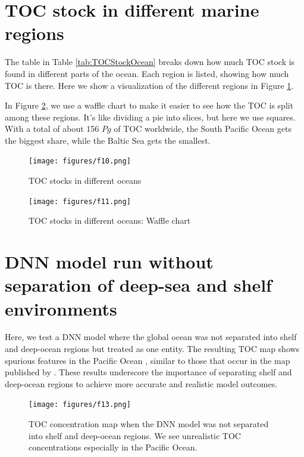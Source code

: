 \documentclass[journal abbreviation, manuscript]{copernicus}
\begin{document}
\newpage
\section{TOC stock in different marine regions}
\label{appendix:tocStockDiffMarine}
The table in Table \ref{tab:TOCStockOcean} breaks down how much TOC stock is found in different parts of the ocean. Each region is listed, showing how much TOC is there. Here we show a visualization of the different regions in Figure \ref{fig:TOCStockOceans}.

In Figure \ref{fig:TOCStockOceansWaffle}, we use a waffle chart to make it easier to see how the TOC is split among these regions. It's like dividing a pie into slices, but here we use squares. With a total of about 156 $Pg$ of TOC worldwide, the South Pacific Ocean gets the biggest share, while the Baltic Sea gets the smallest.
\begin{figure}[!htb]   
\centering
   \texttt{[image: figures/f10.png]}
   \caption{TOC stocks in different oceans}
   \label{fig:TOCStockOceans}
\end{figure}

\begin{figure}[!htb]
   \centering
   \texttt{[image: figures/f11.png]}
   \caption{TOC stocks in different oceans: Waffle chart}
   \label{fig:TOCStockOceansWaffle}
\end{figure}

\newpage
\section{DNN model run without separation of deep-sea and shelf environments}
\label{appendix:entireModel}
Here, we test a DNN model where the global ocean was not separated into shelf and deep-ocean regions but treated as one entity. The resulting TOC map shows spurious features in the Pacific Ocean , similar to those that occur in the map published by \cite{LeeTOCkNN}. These results underscore the importance of separating shelf and deep-ocean regions to achieve more accurate and realistic model outcomes.

\begin{figure}[!htb]
   \centering
   \texttt{[image: figures/f13.png]}
   \caption{TOC concentration map when the DNN model was not separated into shelf and deep-ocean regions. We see unrealistic TOC concentrations especially in the Pacific Ocean.}
   \label{fig:TOCConcEntireModel}
\end{figure}
\end{document}
